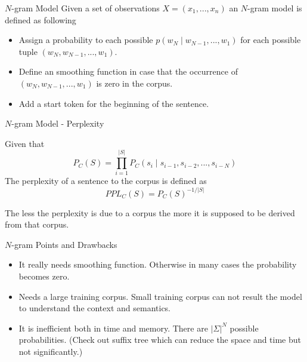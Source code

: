 \documentclass{beamer}
\begin{document}
	\begin{frame}{$N$-gram Model}
		Given a set of observations $X = (x_1 , ... , x_n)$ an $N$-gram model is defined as following \begin{itemize}
			\item<1-> Assign a probability to each possible $p(w_N\mid w_{N - 1}, ..., w_1)$ for each possible tuple $(w_N , w_{N - 1} , ... , w_1)$.
			
			\item<2-> Define an smoothing function in case that the occurrence of  $(w_N , w_{N - 1} , ... , w_1)$ is zero in the corpus. 
			
			\item<3-> Add a start token for the beginning of the sentence. 
		\end{itemize}
	\end{frame}
	\begin{frame}{$N$-gram Model - Perplexity}
		\begin{definition}
			Given that \[
			P_C(S) = \prod_{i = 1}^{|S|} P_C(s_i\mid s_{i - 1},s_{i - 2},..., s_{i - N})
			\]
			The perplexity of a sentence to the corpus is defined as \[
			PPL_C(S) = P_C(S)^{-1/|S|}
			\]
		\end{definition}
		The less the perplexity is due to a corpus the more it is supposed to be derived from that corpus. 
	\end{frame}
	
	\begin{frame}{$N$-gram Points and Drawbacks}
		\begin{itemize}
			\item<1-> It really needs smoothing function. Otherwise in many cases the probability becomes zero.
			\item<2-> Needs a large training corpus. Small training corpus can not result the model to understand the context and semantics.
			\item<3-> It is inefficient both in time and memory. There are $|\Sigma|^N$ possible probabilities. (Check out suffix tree which can reduce the space and time \alert{but not significantly}.)
		\end{itemize}
	\end{frame}
\end{document}
